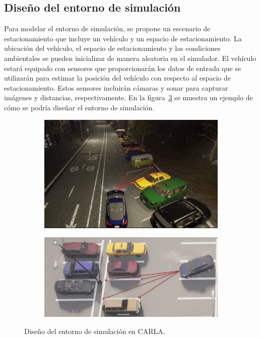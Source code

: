\subsection{Diseño del entorno de simulación}\label{subsec:simulation-design}
\noindent
Para modelar el entorno de simulación, se propone un escenario de estacionamiento que incluye un vehículo y un espacio de estacionamiento.
La ubicación del vehículo, el espacio de estacionamiento y las condiciones ambientales se pueden inicializar de manera aleatoria en el simulador.
El vehículo estará equipado con sensores que proporcionarán los datos de entrada que se utilizarán para estimar la posición del vehículo con respecto al espacio de estacionamiento.
Estos sensores incluirán cámaras y sonar para capturar imágenes y distancias, respectivamente.
En la figura~\ref{fig:simulation-design} se muestra un ejemplo de cómo se podría diseñar el entorno de simulación.

\begin{figure}[!ht]
    \centering
    \begin{subfigure}{0.4\textwidth}
        \includegraphics[width=\textwidth]{img/distances}\label {fig:distances}
    \end{subfigure}
    \begin{subfigure}{0.4\textwidth}
        \includegraphics[width=\textwidth]{img/distances2}\label {fig:distances2}
    \end{subfigure}
    
    \caption{Diseño del entorno de simulación en CARLA.}
    \label{fig:simulation-design}
\end{figure}

